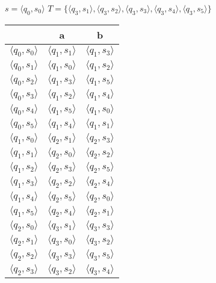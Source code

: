 \documentclass[a4paper,12pt]{article}
\begin{document}
\Large $s = \langle q_0 , s_0 \rangle$\newline
$T = \{\langle q_3 , s_1 \rangle ,\langle q_3 , s_2 \rangle , \langle q_3 , s_3 \rangle , \langle q_3 , s_4 \rangle , \langle q_3 , s_5 \rangle \}$\newline
\begin{center}
\begin{tabular}{ |c|c|c| } 
\hline
  & a & b \\ [0.5ex] 
 \hline
 $\langle q_0 , s_0 \rangle$ & $\langle q_1 , s_1 \rangle$ & $\langle q_1 , s_3 \rangle$ \\ 
 $\langle q_0 , s_1 \rangle$ & $\langle q_1 , s_0 \rangle$ & $\langle q_1 , s_2 \rangle$ \\
 $\langle q_0 , s_2 \rangle$ & $\langle q_1 , s_3 \rangle$ & $\langle q_1 , s_5 \rangle$ \\ 
 $\langle q_0 , s_3 \rangle$ & $\langle q_1 , s_2 \rangle$ & $\langle q_1 , s_4 \rangle$ \\
 $\langle q_0 , s_4 \rangle$ & $\langle q_1 , s_5 \rangle$ & $\langle q_1 , s_0 \rangle$ \\
 $\langle q_0 , s_5 \rangle$ & $\langle q_1 , s_4 \rangle$ & $\langle q_1 , s_1 \rangle$ \\ 
 $\langle q_1 , s_0 \rangle$ & $\langle q_2 , s_1 \rangle$ & $\langle q_2 , s_3 \rangle$ \\ 
 $\langle q_1 , s_1 \rangle$ & $\langle q_2 , s_0 \rangle$ & $\langle q_2 , s_2 \rangle$ \\
 $\langle q_1 , s_2 \rangle$ & $\langle q_2 , s_3 \rangle$ & $\langle q_2 , s_5 \rangle$ \\ 
 $\langle q_1 , s_3 \rangle$ & $\langle q_2 , s_2 \rangle$ & $\langle q_2 , s_4 \rangle$ \\
 $\langle q_1 , s_4 \rangle$ & $\langle q_2 , s_5 \rangle$ & $\langle q_2 , s_0 \rangle$ \\
 $\langle q_1 , s_5 \rangle$ & $\langle q_2 , s_4 \rangle$ & $\langle q_2 , s_1 \rangle$ \\ 
 $\langle q_2 , s_0 \rangle$ & $\langle q_3 , s_1 \rangle$ & $\langle q_3 , s_3 \rangle$ \\ 
 $\langle q_2 , s_1 \rangle$ & $\langle q_3 , s_0 \rangle$ & $\langle q_3 , s_2 \rangle$ \\
 $\langle q_2 , s_2 \rangle$ & $\langle q_3 , s_3 \rangle$ & $\langle q_3 , s_5 \rangle$ \\ 
 $\langle q_2 , s_3 \rangle$ & $\langle q_3 , s_2 \rangle$ & $\langle q_3 , s_4 \rangle$ \\

\end{tabular}
\end{center}
\end{document}
